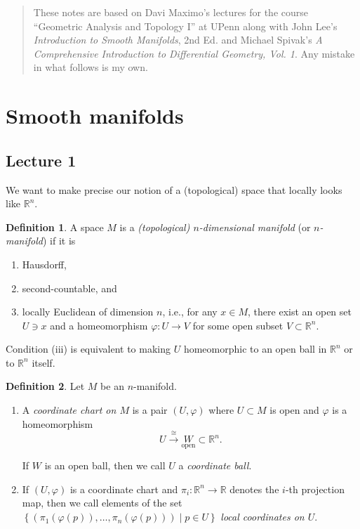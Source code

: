 \documentclass[10pt,letterpaper,cm]{nupset}
\theoremstyle{definition}
\newtheorem{definition}{Definition}[subsection]
\theoremstyle{theorem}
\theoremstyle{remark}
\newcommand{\R}{\mathbb R}
\newcommand{\1}{\mathbf{1}}
\newcommand{\0}{\vec 0}
\begin{document}
\thispagestyle{empty}
\begin{abstract}
These notes are based on Davi Maximo's lectures for the course ``Geometric Analysis and Topology I'' at UPenn along with John Lee's \textit{Introduction to Smooth Manifolds}, 2nd Ed. and Michael Spivak's \textit{A Comprehensive Introduction to Differential Geometry, Vol. 1}. Any mistake in what follows is my own.
\end{abstract}


\tableofcontents
\newpage

\section{Smooth manifolds}

\subsection{Lecture 1}

We want to make precise our notion of a (topological) space that locally looks like $\R^n$.

\theoremstyle{definition}
\begin{definition}{A space $M$ is a \textit{(topological) $n$-dimensional manifold} (or \textit{$n$-manifold}) if it is 
\begin{enumerate}[label=(\roman*)]
\item Hausdorff, 
\item second-countable, and 
\item locally Euclidean of dimension $n$, i.e., for any $x\in M$, there exist an open set $U\ni x$ and a homeomorphism $\varphi : U \to V$ for some open subset $V\subset \R^n$.
\end{enumerate}
}
\end{definition}

Condition (iii) is equivalent to making $U$ homeomorphic to an open ball in $\R^n$ or to $\R^n$ itself.

\begin{definition} Let $M$ be an $n$-manifold.
\begin{enumerate}
\item  A \textit{coordinate chart on $M$} is a pair $(U, \varphi)$ where $U\subset M$ is open and $\varphi$ is a homeomorphism $$U \overset{\cong}{\longrightarrow} \underset{\text{open}} W \subset \R^n.$$

If $W$ is an open ball, then we call $U$ a \textit{coordinate ball}.
\item If $(U, \varphi)$ is a coordinate chart and $\pi_i : \R^n \to \R$ denotes the $i$-th projection map, then we call elements of the set $\left\{\left(\pi_1(\varphi(p)), \ldots, \pi_n(\varphi(p))\right) \mid p \in U\right\}$ \textit{local coordinates on $U$}.
\end{enumerate}
\end{definition}
\end{document}
